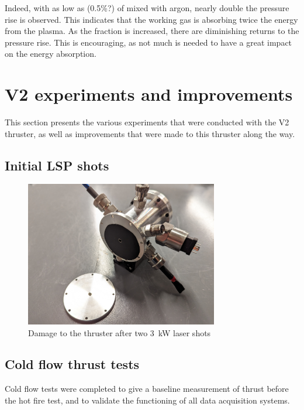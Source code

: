             Indeed, with as low as (0.5\%?) of  mixed with argon, nearly double the pressure rise is observed. This indicates that the working gas is absorbing twice the energy from the plasma. As the  fraction is increased, there are diminishing returns to the pressure rise. This is encouraging, as not much  is needed to have a great impact on the energy absorption.

    \section{V2 experiments and improvements}
        This section presents the various experiments that were conducted with the V2 thruster, as well as improvements that were made to this thruster along the way.
    
        \subsection{Initial LSP shots}

            \begin{figure}
                \centering
                \includegraphics[width=0.75\textwidth]{assets/5 results/V2 test damage.jpg}
                \caption{Damage to the thruster after two \qty{3}{kW} laser shots}
            \end{figure}

        
        \subsection{Cold flow thrust tests}

            Cold flow tests were completed to give a baseline measurement of thrust before the hot fire test, and to validate the functioning of all data acquisition systems.
            
